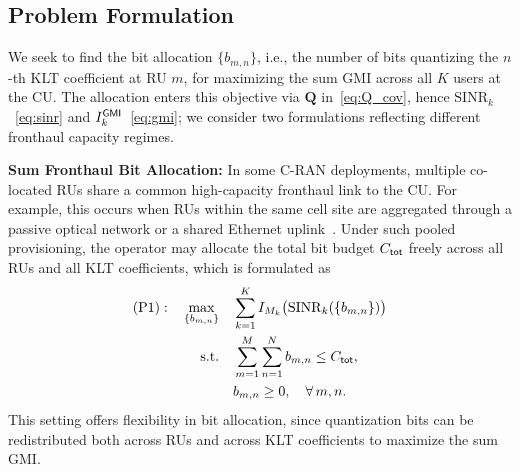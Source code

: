 \documentclass[10pt, twocolumn, comsoc]{IEEEtran}
\begin{document}
\subsection{Problem Formulation}
\label{sec:problem}


We seek to find the bit allocation $\{b_{m,n}\}$, i.e., the number of bits quantizing the $n$-th KLT coefficient at RU $m$, for maximizing the sum GMI across all $K$ users at the CU. The allocation enters this objective via $\mathbf{Q}$ in~\eqref{eq:Q_cov}, hence $\mathrm{SINR}_k$~\eqref{eq:sinr} and $I_k^{\sf GMI}$~\eqref{eq:gmi}; we consider two formulations reflecting different fronthaul capacity regimes.

{\textbf{{Sum Fronthaul Bit Allocation:}}}
In some C-RAN deployments, multiple co-located RUs  share a common high-capacity fronthaul link to the CU. 
For example, this occurs when RUs within the same cell site are aggregated through a passive optical network or a shared Ethernet uplink~\cite{checko2015cloud, peng2015fronthaul}. Under such pooled provisioning, the operator may allocate the total bit budget $C_{\sf tot}$ freely across all RUs and all KLT coefficients, which is formulated as
\begin{align} \label{eq:problem_sum}
  \mathrm{(P1):} \quad 
  \max_{\{b_{m,n}\}} 
  \quad & \sum_{k=1}^{K} 
        I_{M_k} \big(\mathrm{SINR}_k(\{b_{m,n}\})\big) 
        \nonumber \\
  \mathrm{s.t.} 
  \quad & \sum_{m=1}^{M} \sum_{n=1}^{N} b_{m,n} 
        \leq C_{\sf tot}, \\
  & b_{m,n} \geq 0, 
        \quad \forall\, m, n. \nonumber
\end{align}
This setting offers flexibility in bit allocation, since quantization bits can be redistributed both across RUs and across KLT coefficients to maximize the sum GMI.
\end{document}
